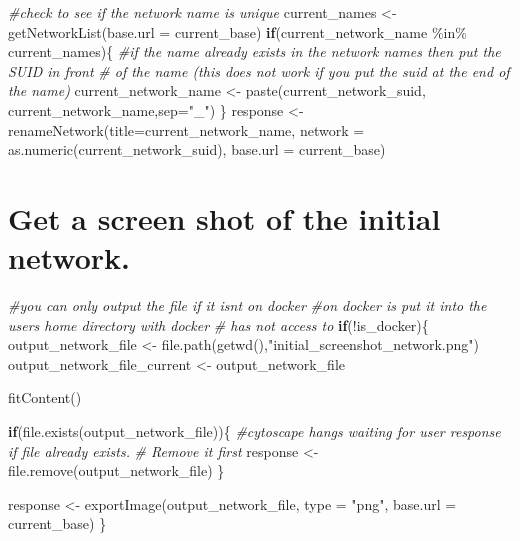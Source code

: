 \documentclass[
]{book}
\newenvironment{Shaded}{\begin{snugshade}}{\end{snugshade}}
\newcommand{\AttributeTok}[1]{\textcolor[rgb]{0.77,0.63,0.00}{#1}}
\newcommand{\CommentTok}[1]{\textcolor[rgb]{0.56,0.35,0.01}{\textit{#1}}}
\newcommand{\ControlFlowTok}[1]{\textcolor[rgb]{0.13,0.29,0.53}{\textbf{#1}}}
\newcommand{\FunctionTok}[1]{\textcolor[rgb]{0.00,0.00,0.00}{#1}}
\newcommand{\NormalTok}[1]{#1}
\newcommand{\OtherTok}[1]{\textcolor[rgb]{0.56,0.35,0.01}{#1}}
\newcommand{\SpecialCharTok}[1]{\textcolor[rgb]{0.00,0.00,0.00}{#1}}
\newcommand{\StringTok}[1]{\textcolor[rgb]{0.31,0.60,0.02}{#1}}
\begin{document}
\begin{Shaded}
\begin{Highlighting}[]
\CommentTok{\#check to see if the network name is unique}
\NormalTok{current\_names }\OtherTok{\textless{}{-}} \FunctionTok{getNetworkList}\NormalTok{(}\AttributeTok{base.url =}\NormalTok{ current\_base)}
\ControlFlowTok{if}\NormalTok{(current\_network\_name }\SpecialCharTok{\%in\%}\NormalTok{ current\_names)\{}
  \CommentTok{\#if the name already exists in the network names then put the SUID in front}
  \CommentTok{\# of the name (this does not work if you put the suid at the end of the name)}
\NormalTok{  current\_network\_name }\OtherTok{\textless{}{-}} \FunctionTok{paste}\NormalTok{(current\_network\_suid,}
\NormalTok{                                current\_network\_name,}\AttributeTok{sep=}\StringTok{"\_"}\NormalTok{)}
\NormalTok{\}}
\NormalTok{response }\OtherTok{\textless{}{-}} \FunctionTok{renameNetwork}\NormalTok{(}\AttributeTok{title=}\NormalTok{current\_network\_name, }
                       \AttributeTok{network =} \FunctionTok{as.numeric}\NormalTok{(current\_network\_suid),}
                       \AttributeTok{base.url =}\NormalTok{ current\_base)}
\end{Highlighting}
\end{Shaded}

\hypertarget{get-a-screen-shot-of-the-initial-network.-1}{%
\section{Get a screen shot of the initial network.}\label{get-a-screen-shot-of-the-initial-network.-1}}

\begin{Shaded}
\begin{Highlighting}[]
\CommentTok{\#you can only output the file if it isn\textquotesingle{}t on docker}
\CommentTok{\#on docker is put it into the user\textquotesingle{}s home directory with docker }
\CommentTok{\# has not access to}
\ControlFlowTok{if}\NormalTok{(}\SpecialCharTok{!}\NormalTok{is\_docker)\{}
\NormalTok{  output\_network\_file }\OtherTok{\textless{}{-}} \FunctionTok{file.path}\NormalTok{(}\FunctionTok{getwd}\NormalTok{(),}\StringTok{"initial\_screenshot\_network.png"}\NormalTok{)}
\NormalTok{  output\_network\_file\_current }\OtherTok{\textless{}{-}}\NormalTok{ output\_network\_file}

  \FunctionTok{fitContent}\NormalTok{()}

  \ControlFlowTok{if}\NormalTok{(}\FunctionTok{file.exists}\NormalTok{(output\_network\_file))\{}
    \CommentTok{\#cytoscape hangs waiting for user response if file already exists.}
    \CommentTok{\# Remove it first}
\NormalTok{    response }\OtherTok{\textless{}{-}} \FunctionTok{file.remove}\NormalTok{(output\_network\_file)}
\NormalTok{  \} }

\NormalTok{  response }\OtherTok{\textless{}{-}} \FunctionTok{exportImage}\NormalTok{(output\_network\_file, }\AttributeTok{type =} \StringTok{"png"}\NormalTok{,}
                          \AttributeTok{base.url =}\NormalTok{ current\_base)}
\NormalTok{\}}
\end{Highlighting}
\end{Shaded}
\end{document}
